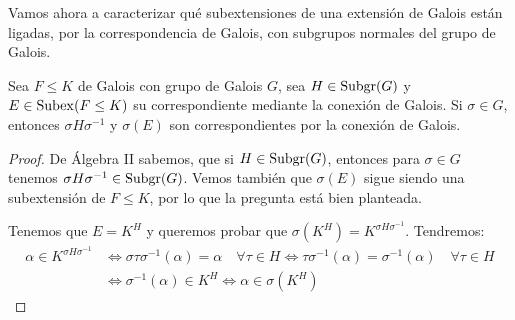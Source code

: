 Vamos ahora a caracterizar qué subextensiones de una extensión de Galois están ligadas, por la correspondencia de Galois, con subgrupos normales del grupo de Galois.
\begin{lema}
    Sea $F\leq K$ de Galois con grupo de Galois $G$, sea $H\in \operatorname{Subgr}(G)$ y $E\in \operatorname{Subex}(F\leq K)$ su correspondiente mediante la conexión de Galois. Si $\sigma\in G$, entonces $\sigma H \sigma^{-1}$ y $\sigma(E)$ son correspondientes por la conexión de Galois.
    \begin{proof}
        De Álgebra II sabemos, que si $H\in \operatorname{Subgr}(G)$, entonces para $\sigma\in G$ tenemos $\sigma H\sigma^{-1}\in \operatorname{Subgr}(G)$. Vemos también que $\sigma(E)$ sigue siendo una subextensión de $F\leq K$, por lo que la pregunta está bien planteada.

        \noindent
        Tenemos que $E = K^H$ y queremos probar que $\sigma(K^H) = K^{\sigma H \sigma^{-1}}$. Tendremos:
        \begin{align*}
            \alpha \in K^{\sigma H \sigma^{-1}} &\Longleftrightarrow \sigma\tau \sigma^{-1}(\alpha) = \alpha \quad \forall \tau \in H \Longleftrightarrow \tau\sigma^{-1}(\alpha) = \sigma^{-1}(\alpha) \quad \forall \tau \in H \\ &\Longleftrightarrow \sigma^{-1}(\alpha) \in K^H \Longleftrightarrow \alpha \in \sigma(K^H)
        \end{align*}
    \end{proof}
\end{lema}

